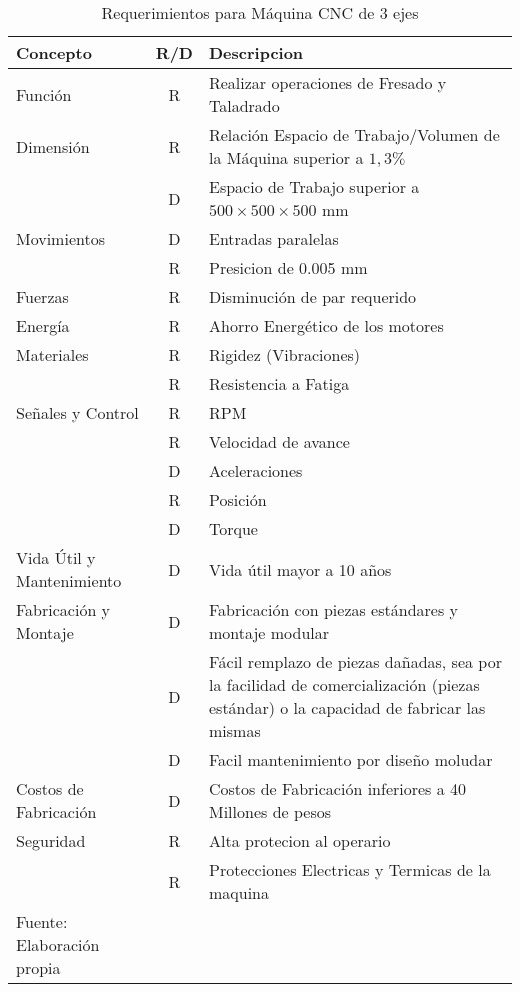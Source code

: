 \begin{longtable}{|>{\columncolor[gray]{0.85}}p{}|c|p{}|}
    \cline{1-3} \rowcolor[gray]{0.85}
    \textbf{Concepto} & \textbf{R/D} & \textbf{Descripcion } \\ \hline %
    Función     & R & Realizar operaciones de Fresado y Taladrado \\ \cline{1-3}
    Dimensión   & R & Relación Espacio de Trabajo/Volumen de la Máquina superior a $1,3\%$ \\
                & D & Espacio de Trabajo superior a $500\times 500\times 500$ mm \\ \cline{1-3}
    Movimientos & D & Entradas  paralelas \\
                & R & Presicion de 0.005 mm \\ \cline{1-3}
    Fuerzas     & R & Disminución de par requerido \\ \cline{1-3}
    Energía     & R & Ahorro Energético de los motores \\ \cline{1-3}
    Materiales  & R & Rigidez (Vibraciones) \\
                & R & Resistencia a Fatiga \\ \cline{1-3}
    Señales y Control   & R & RPM \\
                        & R & Velocidad de avance \\
                        & D & Aceleraciones \\
                        & R & Posición \\
                        & D & Torque \\ \cline{1-3}
    Vida Útil y Mantenimiento & D & Vida útil mayor a 10 años \\ \cline{1-3}
    Fabricación y Montaje   & D & Fabricación con piezas estándares y montaje modular \\
                            & D & Fácil remplazo de piezas dañadas, sea por la facilidad de comercialización (piezas estándar) o la capacidad de fabricar las mismas \\
                            & D & Facil mantenimiento por diseño moludar\\ \cline{1-3}
    Costos de Fabricación   & D & Costos de Fabricación inferiores a 40 Millones de pesos \\ \cline{1-3}
    Seguridad               & R & Alta protecion al operario \\
                            & R & Protecciones Electricas y Termicas de la maquina \\
    \cline{1-3}
    \caption{Requerimientos para Máquina CNC de 3 ejes}{Fuente: Elaboración propia}
\end{longtable}